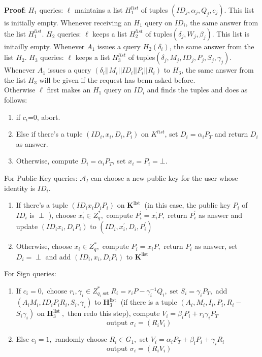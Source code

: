 \documentclass[11pt]{article}
\begin{document}
\textbf{Proof}: $H_1$ queries: $\ell$ maintains a list $H^{list}_1$ of tuples $(ID_j,\alpha_j,Q_j,c_j)$. This list is initially empty. Whenever receiving an $H_1$ query on $ID_i$, the same answer from the list $H^{list}_1$. $H_2$ queries: $\ell$ keeps a list $H^{list}_2$ of tuples$(\delta_j,W_j,\beta_j)$. This list is initailly empty. Whenever $A_1$ issues a query $H_2(\delta_i)$, the same answer from the list $H_2$. $H_3$ queries: $\ell$ keeps a list $H^{list}_3$ of tuples$(\delta_j,M_j,ID_j,P_j,S_j,\gamma_j)$. Whenever $A_1$ issues a query $(\delta_i||M_i||ID_i||P_i||R_i)$ to $H_3$, the same answer from the list $H_3$ will be given if the request has benn asked before.\\
Otherwise $\ell$ first makes an $H_1$ query on $ID_i$ and finds the tuples and does as follows:
\begin{enumerate}
  \item if $c_i$=0, abort.
  \item Else if there's a tuple $(ID_i,x_i,D_i,P_i)$ on $K^{list}$, set $D_i = \alpha_iP_T$ and return $D_i$ as answer. 
  \item Otherwise, compute $D_i = \alpha_iP_T$, set $x_i=P_i=\bot$. 
\end{enumerate}
For Public-Key queries: \(\mathcal{A}_{I}\) can choose a new public key for the user whose identity is $ID_i$.
\begin{enumerate}
      \item If there's a tuple \(\left(I D_{i} x_{i} D_{i} P_{i}\right)\) on \(\mathbf{K}^{\text {list }}\) (in this case, the public key \(P_{i}\) of \(I D_{i}\) is \(\perp\) ), choose \(x_{i}^{\prime} \in Z_{q}^{*},\) compute \(P_{i}^{\prime}=x_{i}^{\prime} P,\) return \(P_{i}^{\prime}\) as answer and update \(\left(I D_{i} x_{i}, D_{i} P_{i}\right)\) to \(\left(I D_{i}, x_{i}^{\prime}, D_{i}, P_{i}^{\prime}\right)\)
      \item Otherwise, choose \(x_{i} \in Z_{q}^{*},\) compute \(P_{i}=x_{i} P,\) return \(P_{i}\) as answer, set \(D_{i}=\perp\) and add \(\left(I D_{i}, x_{i}, D_{i} P_{i}\right)\) to \(\mathbf{K}^{\text {list }}\)
\end{enumerate}
For Sign queries: 
\begin{enumerate}
      \item If \(c_{i}=0,\) choose \(r_{i}, \gamma_{i} \in Z_{q_{i} \text { set }}^{*} R_{i}=r_{i} P-\gamma_{i}^{-1} Q_{i}, \operatorname{set} S_{i}=\gamma_{i} P_{T},\) add\(\left(A_{i} M_{i}, I D_{i} P_{i} R_{i}, S_{i}, \gamma_{i}\right)\) to \(\mathbf{H}_{3}^{\text {list }}\) (if there is a tuple \(\left(A_{i}, M_{i}, I_{i}, P_{i}, R_{i}-\right.\)\(\left.S_{i} \gamma_{i}\right)\) on \(\mathbf{H}_{3}^{\text {list }},\) then redo this step), compute \(V_{i}=\beta_{i} P_{i}+r_{i} \gamma_{i} P_{T}\)\[\text { output } \sigma_{i}=\left(R_{i} V_{i}\right)\]
      \item Else \(c_{i}=1,\) randomly choose \(R_{i} \in G_{1},\) set \(V_{i}=\alpha_{i} P_{T}+\beta_{i} P_{i}+\gamma_{i} R_{i}\)
      \[\text { output } \sigma_{i}=\left(R_{i} V_{i}\right)\]
\end{enumerate}
\end{document}
